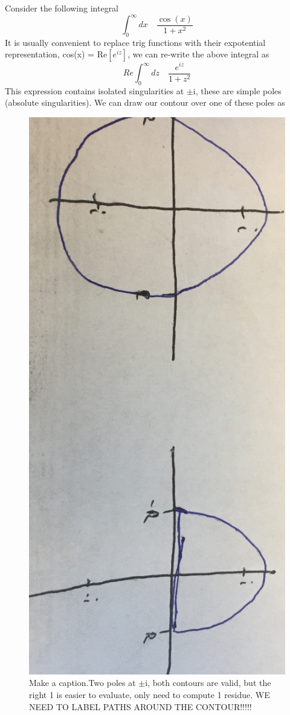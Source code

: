 \documentclass{article}
\newcommand{\be}{\begin{equation}}
\newcommand{\ee}{\end{equation}}
\begin{document}
Consider the following integral
\be
\int_0^\infty dx \quad \frac{\cos(x)}{1+x^2}
\ee
It is usually convenient to replace trig functions with their expotential representation, cos(x) = Re$\left[e^{iz}\right]$, we can re-write the above integral as
\be
Re\int_0^\infty dz \quad \frac{e^{iz}}{1+z^2}
\ee
This expression contains isolated singularities at $\pm$i, these are simple poles (absolute singularities). 
We can draw our contour over one of these poles as

\begin{figure}[H]
  \centering
    \includegraphics[scale=0.2]{Figures/example.png}
    \caption{Make a caption.Two poles at $\pm$i, both contours are valid, but the right 1 is easier to evaluate, only need to compute 1 residue. WE NEED TO LABEL PATHS  AROUND THE CONTOUR!!!!!}
\end{figure}
\end{document}
